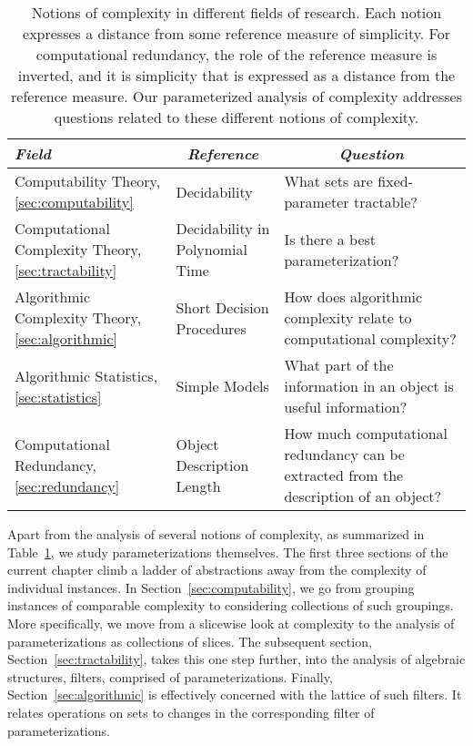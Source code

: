 \begin{table}
  \centering
  \begin{tabular}{p{4cm}p{3cm}p{6.266cm}}
    \multicolumn{1}{l}{\hfill\emph{Field}\rlap{,}\hfill\llap{\emph{\S}}} & \multicolumn{1}{c}{\emph{Reference}} & \multicolumn{1}{c}{\emph{Question}} \\
    \hline\noalign{\vspace{2ex}}
    Computability Theory, \hspace*{\fill}\ref{sec:computability} & Decidability & What sets are fixed-parameter tractable? \\[2ex]
    Computational Complexity Theory, \hspace*{\fill}\ref{sec:tractability} & Decidability in Polynomial Time & Is there a best parameterization?\newline \\[2ex]
    Algorithmic Complexity Theory, \hspace*{\fill}\ref{sec:algorithmic} & Short Decision Procedures & How does algorithmic complexity relate to computational complexity? \\[2ex]
    Algorithmic Statistics, \hspace*{\fill}\ref{sec:statistics} & Simple Models & What part of the information in an object is useful information? \\[2ex]
    Computational Redundancy, \hspace*{\fill}\ref{sec:redundancy} & Object Description Length & How much computational redundancy can be extracted from the description of an object?
  \end{tabular}
  \caption{
    Notions of complexity in different fields of research.
    Each notion expresses a distance from some reference measure of simplicity.
    For computational redundancy, the role of the reference measure is inverted, and it is simplicity that is expressed as a distance from the reference measure.
    Our parameterized analysis of complexity addresses questions related to these different notions of complexity.
  }
  \label{tab:summary}
\end{table}

Apart from the analysis of several notions of complexity, as summarized in Table~\ref{tab:summary}, we study parameterizations themselves.
The first three sections of the current chapter climb a ladder of abstractions away from the complexity of individual instances.
In Section~\ref{sec:computability}, we go from grouping instances of comparable complexity to considering collections of such groupings.
More specifically, we move from a slicewise look at complexity to the analysis of parameterizations as collections of slices.
The subsequent section, Section~\ref{sec:tractability}, takes this one step further, into the analysis of algebraic structures, filters, comprised of parameterizations.
Finally, Section~\ref{sec:algorithmic} is effectively concerned with the lattice of such filters.
It relates operations on sets to changes in the corresponding filter of parameterizations.

